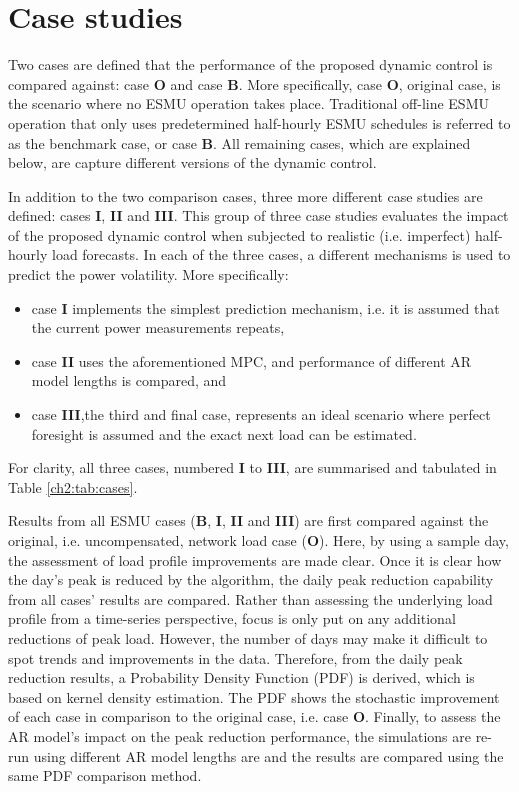 \section{Case studies}
\label{ch2:sec:case-studies}

Two cases are defined that the performance of the proposed dynamic control is compared against: case \textbf{O} and case \textbf{B}.
More specifically, case \textbf{O}, original case, is the scenario where no ESMU operation takes place.
Traditional off-line ESMU operation that only uses predetermined half-hourly ESMU schedules is referred to as the benchmark case, or case \textbf{B}.
All remaining cases, which are explained below, are capture different versions of the dynamic control.

In addition to the two comparison cases, three more different case studies are defined: cases \textbf{I}, \textbf{II} and \textbf{III}.
This group of three case studies evaluates the impact of the proposed dynamic control when subjected to realistic (i.e. imperfect) half-hourly load forecasts.
In each of the three cases, a different mechanisms is used to predict the power volatility.
More specifically:
\begin{itemize}
	\item case \textbf{I} implements the simplest prediction mechanism, i.e. it is assumed that the current power measurements repeats,
	\item case \textbf{II} uses the aforementioned MPC, and performance of different AR model lengths is compared, and
	\item case \textbf{III},the third and final case, represents an ideal scenario where perfect foresight is assumed and the exact next load can be estimated.
\end{itemize}
For clarity, all three cases, numbered \textbf{I} to \textbf{III}, are summarised and tabulated in Table \ref{ch2:tab:cases}.



Results from all ESMU cases (\textbf{B}, \textbf{I}, \textbf{II} and \textbf{III}) are first compared against the original, i.e. uncompensated, network load case (\textbf{O}).
Here, by using a sample day, the assessment of load profile improvements are made clear.
Once it is clear how the day's peak is reduced by the algorithm, the daily peak reduction capability from all cases' results are compared.
Rather than assessing the underlying load profile from a time-series perspective, focus is only put on any additional reductions of peak load.
However, the number of days may make it difficult to spot trends and improvements in the data.
Therefore, from the daily peak reduction results, a Probability Density Function (PDF) is derived, which is based on kernel density estimation.
The PDF shows the stochastic improvement of each case in comparison to the original case, i.e. case \textbf{O}.
Finally, to assess the AR model's impact on the peak reduction performance, the simulations are re-run using different AR model lengths are and the results are compared using the same PDF comparison method.
